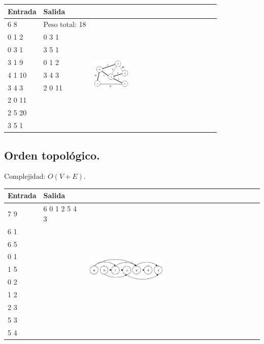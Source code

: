 \documentclass[11pt, letterpaper, twoside]{article}
\begin{document}
\begin{tabular}{|p{4cm}|p{4cm}|p{7.5cm}|}
\hline
\textbf{Entrada} & \textbf{Salida} & \\ \hline
6 8    & Peso total: 18 & \multirow{9}{*}{\includegraphics[width = 0.3\textwidth]{Grafos/Imagenes/MST.png}}\\
0 1 2  & 0 3 1  &\\
0 3 1  & 3 5 1  &\\
3 1 9  & 0 1 2  &\\
4 1 10 & 3 4 3  &\\
3 4 3  & 2 0 11 &\\
2 0 11 & & \\
2 5 20 & & \\
3 5 1  & & \\ \hline
\end{tabular}

\subsection{Orden topológico.}

Complejidad: $O(V + E)$.



\begin{tabular}{|p{3.75cm}|p{3.75cm}|p{8cm}|}
\hline
\textbf{Entrada} & \textbf{Salida} & \\ \hline
7 9 & 6 0 1 2 5 4 3 & \multirow{10}{*}{\includegraphics[width = 0.45\textwidth]{Grafos/Imagenes/TopoSort.png}} \\
6 1 & & \\
6 5 & & \\
0 1 & & \\
1 5 & & \\
0 2 & & \\
1 2 & & \\
2 3 & & \\
5 3 & & \\ 
5 4 & & \\ \hline
\end{tabular}
\end{document}
